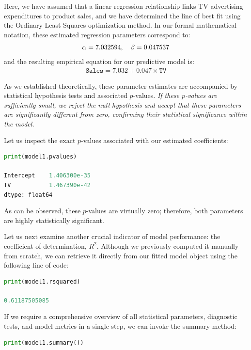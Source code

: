 Here, we have assumed that a linear regression relationship links TV advertising expenditures to product sales, and we have determined the line of best fit using the Ordinary Least Squares optimization method. In our formal mathematical notation, these estimated regression parameters correspond to:
\begin{align}
	\alpha = 7.032594, \quad \beta = 0.047537
\end{align}
and the resulting empirical equation for our predictive model is:
\begin{align}
	\texttt{Sales} = 7.032 + 0.047 \times \texttt{TV}
\end{align}

As we established theoretically, these parameter estimates are accompanied by statistical hypothesis tests and associated $p$-values. \emph{If these $p$-values are sufficiently small, we reject the null hypothesis and accept that these parameters are significantly different from zero, confirming their statistical significance within the model.}

Let us inspect the exact $p$-values associated with our estimated coefficients:
\begin{lstlisting}[language=Python]
print(model1.pvalues)

Intercept    1.406300e-35
TV           1.467390e-42
dtype: float64
\end{lstlisting}

As can be observed, these $p$-values are virtually zero; therefore, both parameters are highly statistically significant.

Let us next examine another crucial indicator of model performance: the coefficient of determination, $R^2$. Although we previously computed it manually from scratch, we can retrieve it directly from our fitted model object using the following line of code:
\begin{lstlisting}[language=Python]
print(model1.rsquared)

0.61187505085
\end{lstlisting}

If we require a comprehensive overview of all statistical parameters, diagnostic tests, and model metrics in a single step, we can invoke the summary method:
\begin{lstlisting}[language=Python]
print(model1.summary())
\end{lstlisting}

